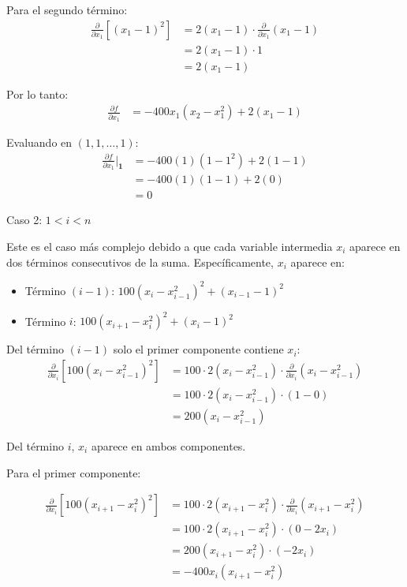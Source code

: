 \documentclass{article}
\begin{document}
Para el segundo término:
\begin{align}
\frac{\partial}{\partial x_1}\left[(x_1 - 1)^2\right] &= 2(x_1 - 1) \cdot \frac{\partial}{\partial x_1}(x_1 - 1) \\
&= 2(x_1 - 1) \cdot 1 \\
&= 2(x_1 - 1)
\end{align}

Por lo tanto:
\begin{align}
\frac{\partial f}{\partial x_1} &= -400x_1(x_2 - x_1^2) + 2(x_1 - 1)
\end{align}

Evaluando en $(1, 1, \ldots, 1)$:
\begin{align}
\frac{\partial f}{\partial x_1}\bigg|_{\mathbf{1}} &= -400(1)(1 - 1^2) + 2(1 - 1) \\
&= -400(1)(1 - 1) + 2(0) \\
&= 0
\end{align}

Caso 2: $1 < i < n$

Este es el caso más complejo debido a que cada variable intermedia $x_i$ aparece en dos términos consecutivos de la suma. Específicamente, $x_i$ aparece en:

\begin{itemize}
    \item Término $(i-1)$: $100(x_i - x_{i-1}^2)^2 + (x_{i-1} - 1)^2$
    \item Término $i$: $100(x_{i+1} - x_i^2)^2 + (x_i - 1)^2$
\end{itemize}

Del término $(i-1)$ solo el primer componente contiene $x_i$:
\begin{align}
\frac{\partial}{\partial x_i}\left[100(x_i - x_{i-1}^2)^2\right] &= 100 \cdot 2(x_i - x_{i-1}^2) \cdot \frac{\partial}{\partial x_i}(x_i - x_{i-1}^2) \\
&= 100 \cdot 2(x_i - x_{i-1}^2) \cdot (1 - 0) \\
&= 200(x_i - x_{i-1}^2)
\end{align}

Del término $i$, $x_i$ aparece en ambos componentes.

Para el primer componente:

\begin{align}
\frac{\partial}{\partial x_i}\left[100(x_{i+1} - x_i^2)^2\right] &= 100 \cdot 2(x_{i+1} - x_i^2) \cdot \frac{\partial}{\partial x_i}(x_{i+1} - x_i^2) \\
&= 100 \cdot 2(x_{i+1} - x_i^2) \cdot (0 - 2x_i) \\
&= 200(x_{i+1} - x_i^2) \cdot (-2x_i) \\
&= -400x_i(x_{i+1} - x_i^2)
\end{align}
\end{document}
